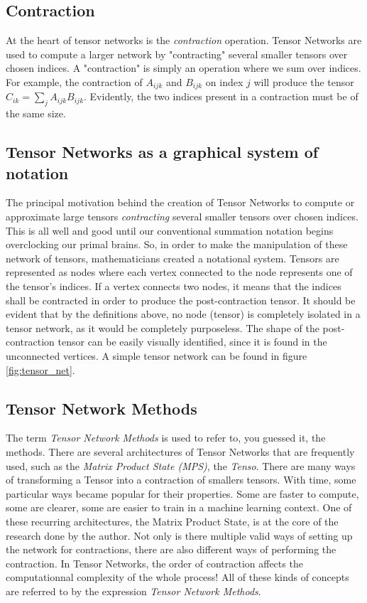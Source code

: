 \documentclass{article}
\theoremstyle{definition}
\theoremstyle{definition}
\begin{document}
\subsection{Contraction}
At the heart of tensor networks is the {\it contraction} operation.
Tensor Networks are used to compute a larger network by "contracting" several
smaller tensors over chosen indices. A "contraction" is simply an operation 
where we sum over indices. For example, the contraction of $A_{ijk}$ and 
$B_{ijk}$ on index $j$ will produce the tensor $C_{ik} = \sum_{j} A_{ijk} B_{ijk}$.
Evidently, the two indices present in a contraction must be of the same size.

\subsection{Tensor Networks as a graphical system of notation}
The principal motivation behind the creation of Tensor Networks to compute or approximate large tensors {\it contracting} several smaller tensors over chosen indices. 
This is all well and good until our conventional summation notation begins overclocking our primal brains.
So, in order to make the manipulation of these network of tensors, mathematicians created a notational system. 
Tensors are represented as nodes where each vertex connected to the node represents one of the tensor's indices. 
If a vertex connects two nodes, it means that the indices shall be contracted in order to produce the post-contraction tensor. 
It should be evident that by the definitions above, no node (tensor) is completely isolated in a tensor network, as it would be completely purposeless. 
The shape of the post-contraction tensor can be easily visually identified, since it is found in the unconnected vertices.
A simple tensor network can be found in figure \ref{fig:tensor_net}.

\subsection{Tensor Network Methods}
The term {\it Tensor Network Methods} is used to refer to, you guessed it, the methods.
There are several architectures of Tensor Networks that are frequently used, such as the {\it Matrix Product State (MPS)}, the {\it Tenso}.
There are many ways of transforming a Tensor into a contraction of smallers tensors. 
With time, some particular ways became popular for their properties. 
Some are faster to compute, some are clearer, some are easier to train in a machine learning context. 
One of these recurring architectures, the Matrix Product State, is at the core of the research done by the author.
Not only is there multiple valid ways of setting up the network for contractions, there are also different ways of performing the contraction.
In Tensor Networks, the order of contraction affects the computationnal complexity of the whole process!
All of these kinds of concepts are referred to by the expression \emph{Tensor Network Methods}. 
\end{document}

